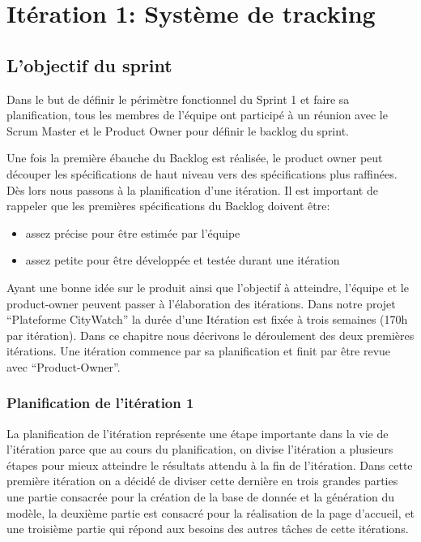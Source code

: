 \section{Itération 1: Système de tracking}

\subsection{L'objectif du sprint}

Dans le but de définir le périmètre fonctionnel du Sprint 1 et faire
sa planification, tous les membres de l'équipe ont participé à un réunion
avec le Scrum Master et le Product Owner pour définir le backlog du sprint.

Une fois la première ébauche du Backlog est réalisée, le product owner peut découper
les spécifications de haut niveau vers des spécifications plus raffinées. Dès lors nous
passons à la planification d’une itération. Il est important de rappeler que les premières
spécifications du Backlog doivent être:
\begin{itemize}
 \item assez précise pour être estimée par l'équipe
 \item assez petite pour être développée et testée durant une itération
\end{itemize}
Ayant une bonne idée sur le produit ainsi que l'objectif à atteindre, l'équipe et le
product-owner peuvent passer à l'élaboration des itérations.
Dans notre projet ``Plateforme CityWatch'' la durée d’une Itération est fixée à trois
semaines (170h par itération). Dans ce chapitre nous décrivons le déroulement des deux
premières itérations. Une itération commence par sa planification et finit par être revue
avec ``Product-Owner''.

\subsubsection{Planification de l'itération 1}

La planification de l'itération représente une étape importante dans la vie de
l'itération parce que au cours du planification, on divise l'itération a plusieurs étapes
pour mieux atteindre le résultats attendu à la fin de l'itération.
Dans cette première itération on a décidé de diviser cette dernière en trois grandes
parties une partie consacrée pour la création de la base de donnée et la génération du
modèle, la deuxième partie est consacré pour la réalisation de la page d’accueil, et une
troisième partie qui répond aux besoins des autres tâches de cette itérations.

